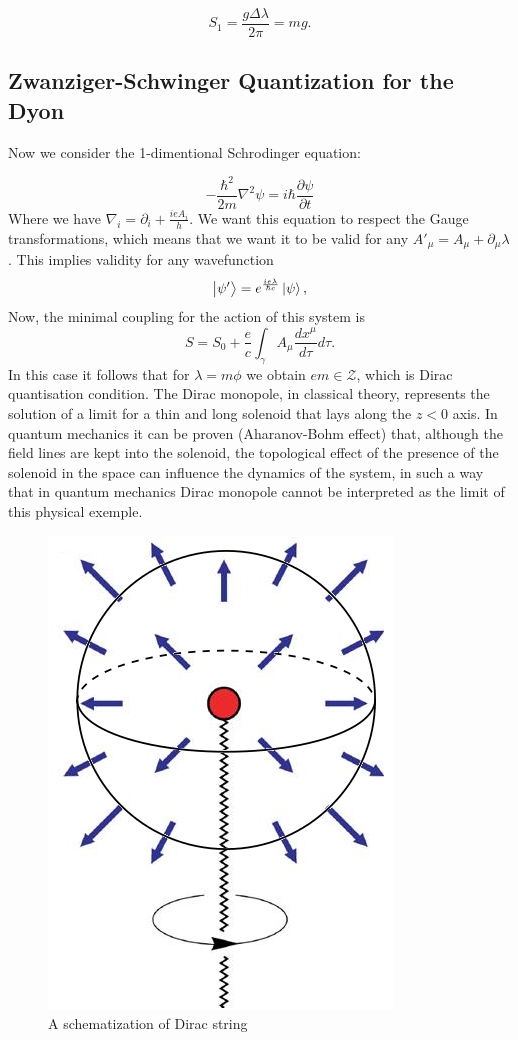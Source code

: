 \documentclass[main.tex]{subfiles}
\begin{document}
\begin{equation}
S_1=\frac{g\Delta\lambda}{2\pi}=mg.
\end{equation}
\subsection{Zwanziger-Schwinger Quantization for the Dyon}

Now we consider the 1-dimentional Schrodinger equation:

\begin{equation}
    -\frac{\hbar^2}{2m}\nabla^2\psi=i\hbar\frac{\partial\psi}{\partial t}
\end{equation}
Where we have $\nabla_i=\partial_i+\frac{ie A_i}{h}$. We want this equation to respect the Gauge transformations, which means that we want it to be valid for any $A'_{\mu}=A_{\mu}+\partial_{\mu}\lambda$. This implies validity for any wavefunction
\begin{equation}
\ket{\psi'}=e^{\frac{ie\lambda}{\hbar c}}\ket{\psi},
\end{equation}
Now, the minimal coupling for the action of this system is
\begin{equation}
S=S_0+\frac{e}{c}\int_{\gamma}A_{\mu}\frac{dx^{\mu}}{d\tau}d\tau.
\end{equation}
In this case it follows
that for $\lambda=m\phi$ we obtain $em\in \mathcal{Z}$, which is Dirac quantisation condition. The Dirac monopole, in classical theory, represents the solution of a limit for a thin and long solenoid that lays along the $z<0$ axis. In quantum mechanics it can be proven (Aharanov-Bohm effect) that, although the field lines are kept into the solenoid, the topological effect of the presence of the solenoid in the space can influence the dynamics of the system, in such a way that in quantum mechanics Dirac monopole cannot be interpreted as the limit of this physical exemple.
\begin{figure}[h]
\centering
\includegraphics[scale=0.3]{DiracMon.png}
\caption{A schematization of Dirac string}
\label{fig-DirMon}
\end{figure}
\end{document}
